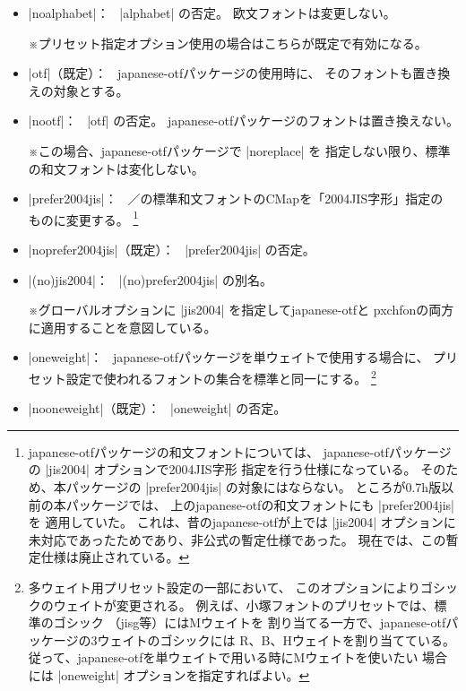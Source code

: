 \documentclass[uplatex,dvipdfmx,a4paper]{jsarticle}
\newcommand{\Pkg}[1]{\textsf{#1}}
\newcommand{\Note}{\par\noindent ※}
\newcommand{\Means}{：\ }
\begin{document}
\begin{itemize}
\item |noalphabet|\Means
  |alphabet| の否定。
  欧文フォントは変更しない。
  \Note プリセット指定オプション使用の場合はこちらが既定で有効になる。
\item |otf|（既定）\Means
  \Pkg{japanese-otf}パッケージの使用時に、
  そのフォントも置き換えの対象とする。
\item |nootf|\Means
  |otf| の否定。
  \Pkg{japanese-otf}パッケージのフォントは置き換えない。
  \Note この場合、\Pkg{japanese-otf}パッケージで |noreplace| を
  指定しない限り、標準の和文フォントは変化しない。
\item |prefer2004jis|\Means
  {\pTeX}／{\upTeX}の標準和文フォントのCMapを「2004JIS字形」指定の
  ものに変更する。
  \footnote{\Pkg{japanese-otf}パッケージの和文フォントについては、
    \Pkg{japanese-otf}パッケージの |jis2004| オプションで2004JIS字形
    指定を行う仕様になっている。
    そのため、本パッケージの |prefer2004jis| の対象にはならない。
    ところが0.7h版以前の本パッケージでは、
    {\upTeX}上の\Pkg{japanese-otf}の和文フォントにも |prefer2004jis| を
    適用していた。
    これは、昔の\Pkg{japanese-otf}が{\upTeX}上では |jis2004| オプションに
    未対応であったためであり、非公式の暫定仕様であった。
    現在では、この暫定仕様は廃止されている。}
\item |noprefer2004jis|（既定）\Means
  |prefer2004jis| の否定。
\item |(no)jis2004|\Means
  |(no)prefer2004jis| の別名。
  \Note グローバルオプションに |jis2004| を指定して\Pkg{japanese-otf}と
  \Pkg{pxchfon}の両方に適用することを意図している。
\item |oneweight|\Means
  \Pkg{japanese-otf}パッケージを単ウェイトで使用する場合に、
  プリセット設定で使われるフォントの集合を{\pTeX}標準と同一にする。
  \footnote{多ウェイト用プリセット設定の一部において、
  このオプションによりゴシックのウェイトが変更される。
  例えば、小塚フォントのプリセットでは、{\pTeX}標準のゴシック
  （jisg等）にはMウェイトを
  割り当てる一方で、\Pkg{japanese-otf}パッケージの3ウェイトのゴシックには
  R、B、Hウェイトを割り当てている。
  従って、\Pkg{japanese-otf}を単ウェイトで用いる時にMウェイトを使いたい
  場合には |oneweight| オプションを指定すればよい。}
\item |nooneweight|（既定）\Means
  |oneweight| の否定。
\end{itemize}
\end{document}
